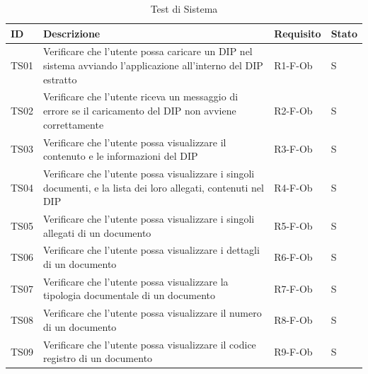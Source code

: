 \documentclass[a4paper,12pt]{article}
\begin{document}
            \begin{longtable}{|M{1.2cm}|M{6.3cm}|M{2.5cm}|M{1.5cm}|}
                
                \caption{Test di Sistema} \\
                \hline
                \textbf{ID} & \textbf{Descrizione} & \textbf{Requisito} & \textbf{Stato} \\
                \hline
                \endhead

                TS01 & Verificare che l’utente possa caricare un DIP nel sistema avviando l’applicazione all’interno del DIP estratto & R1-F-Ob & S \\
                \hline

                TS02 & Verificare che l’utente riceva un messaggio di errore se il caricamento del DIP non avviene correttamente & R2-F-Ob & S \\
                \hline

                TS03 & Verificare che l’utente possa visualizzare il contenuto e le informazioni del DIP & R3-F-Ob & S \\
                \hline

                TS04 & Verificare che l’utente possa visualizzare i singoli documenti, e la lista dei loro allegati, contenuti nel DIP & R4-F-Ob & S \\
                \hline

                TS05 & Verificare che l’utente possa visualizzare i singoli allegati di un documento & R5-F-Ob & S \\
                \hline

                TS06 & Verificare che l’utente possa visualizzare i dettagli di un documento & R6-F-Ob & S \\
                \hline

                TS07 & Verificare che l’utente possa visualizzare la tipologia documentale di un documento & R7-F-Ob & S \\
                \hline

                TS08 & Verificare che l’utente possa visualizzare il numero di un documento & R8-F-Ob & S \\
                \hline

                TS09 & Verificare che l’utente possa visualizzare il codice registro di un documento & R9-F-Ob & S \\
                \hline


\end{longtable}
\end{document}

